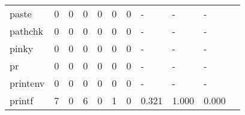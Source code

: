 \begin{longtable}{lp{1.2cm}p{1.2cm}p{1.2cm}p{1.2cm}p{1.2cm}p{1.2cm}p{1.2cm}p{1.2cm}p{1.2cm}p{1.2cm}}
paste     &                                     0 &                                                  0 &                                                0 &                                               0 &                                                0 &                                              0 &                                                  - &                                                  - &                                                  - \\
pathchk   &                                     0 &                                                  0 &                                                0 &                                               0 &                                                0 &                                              0 &                                                  - &                                                  - &                                                  - \\
pinky     &                                     0 &                                                  0 &                                                0 &                                               0 &                                                0 &                                              0 &                                                  - &                                                  - &                                                  - \\
pr        &                                     0 &                                                  0 &                                                0 &                                               0 &                                                0 &                                              0 &                                                  - &                                                  - &                                                  - \\
printenv  &                                     0 &                                                  0 &                                                0 &                                               0 &                                                0 &                                              0 &                                                  - &                                                  - &                                                  - \\
printf    &                                     7 &                                                  0 &                                                6 &                                               0 &                                                1 &                                              0 &                                              0.321 &                                              1.000 &                                              0.000 \\

\end{longtable}
